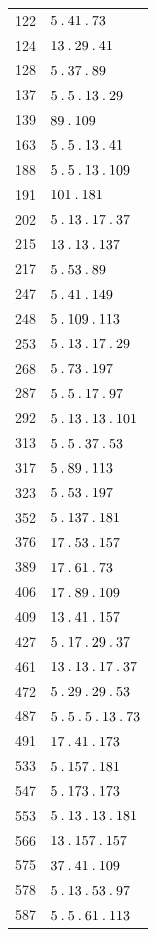 \begin{longtable}{@{}r|l@{}}
122 & $5\mathbin{.} 41\mathbin{.} 73$\\
124 & $13\mathbin{.} 29\mathbin{.} 41$\\
128 & $5\mathbin{.} 37\mathbin{.} 89$\\
137 & $5\mathbin{.} 5\mathbin{.} 13\mathbin{.} 29$\\
139 & $89\mathbin{.} 109$\\
163 & $5\mathbin{.} 5\mathbin{.} 13\mathbin{.} 41$\\
188 & $5\mathbin{.} 5\mathbin{.} 13\mathbin{.} 109$\\
191 & $101\mathbin{.} 181$\\
202 & $5\mathbin{.} 13\mathbin{.} 17\mathbin{.} 37$\\
215 & $13\mathbin{.} 13\mathbin{.} 137$\\
217 & $5\mathbin{.} 53\mathbin{.} 89$\\
247 & $5\mathbin{.} 41\mathbin{.} 149$\\
248 & $5\mathbin{.} 109\mathbin{.} 113$\\
253 & $5\mathbin{.} 13\mathbin{.} 17\mathbin{.} 29$\\
268 & $5\mathbin{.} 73\mathbin{.} 197$\\
287 & $5\mathbin{.} 5\mathbin{.} 17\mathbin{.} 97$\\
292 & $5\mathbin{.} 13\mathbin{.} 13\mathbin{.} 101$\\
313 & $5\mathbin{.} 5\mathbin{.} 37\mathbin{.} 53$\\
317 & $5\mathbin{.} 89\mathbin{.} 113$\\
323 & $5\mathbin{.} 53\mathbin{.} 197$\\
352 & $5\mathbin{.} 137\mathbin{.} 181$\\
376 & $17\mathbin{.} 53\mathbin{.} 157$\\
389 & $17\mathbin{.} 61\mathbin{.} 73$\\
406 & $17\mathbin{.} 89\mathbin{.} 109$\\
409 & $13\mathbin{.} 41\mathbin{.} 157$\\
427 & $5\mathbin{.} 17\mathbin{.} 29\mathbin{.} 37$\\
461 & $13\mathbin{.} 13\mathbin{.} 17\mathbin{.} 37$\\
472 & $5\mathbin{.} 29\mathbin{.} 29\mathbin{.} 53$\\
487 & $5\mathbin{.} 5\mathbin{.} 5\mathbin{.} 13\mathbin{.} 73$\\
491 & $17\mathbin{.} 41\mathbin{.} 173$\\
533 & $5\mathbin{.} 157\mathbin{.} 181$\\
547 & $5\mathbin{.} 173\mathbin{.} 173$\\
553 & $5\mathbin{.} 13\mathbin{.} 13\mathbin{.} 181$\\
566 & $13\mathbin{.} 157\mathbin{.} 157$\\
575 & $37\mathbin{.} 41\mathbin{.} 109$\\
578 & $5\mathbin{.} 13\mathbin{.} 53\mathbin{.} 97$\\
587 & $5\mathbin{.} 5\mathbin{.} 61\mathbin{.} 113$\\

\end{longtable}
